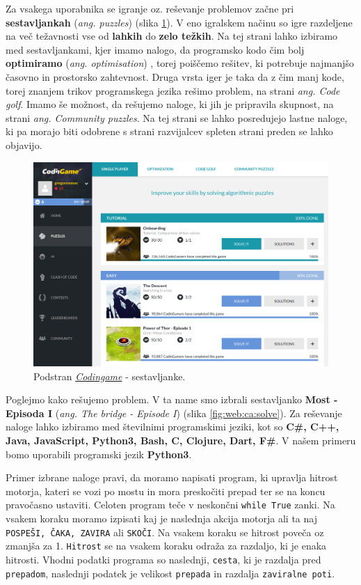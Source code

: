 Za vsakega uporabnika se igranje oz. reševanje problemov začne pri
\textbf{sestavljankah} (\emph{ang. puzzles}) (slika
\ref{fig:web:ca:puzz}). V eno igralskem načinu so igre razdeljene na
več težavnosti vse od \textbf{lahkih} do \textbf{zelo težkih}. Na tej
strani lahko izbiramo med sestavljankami, kjer imamo nalogo, da
programsko kodo čim bolj \textbf{optimiramo}
(\emph{ang. optimisation}) , torej poiščemo rešitev, ki potrebuje
najmanjšo časovno in prostorsko zahtevnost. Druga vrsta iger je taka
da z čim manj kode, torej znanjem trikov programskega jezika rešimo
problem, na strani \emph{ang. Code golf}. Imamo še možnost, da
rešujemo naloge, ki jih je pripravila skupnost, na strani
\emph{ang. Community puzzles}. Na tej strani se lahko posredujejo
lastne naloge, ki pa morajo biti odobrene s strani razvijalcev spleten
strani preden se lahko objavijo.  

\begin{figure}[h!]
  \centering
    \includegraphics [width=0.75\linewidth, keepaspectratio =
   1] {./images/sc_web/codingame_puzz-v01.png}
   \caption{Podstran \emph{\href{https://www.codingame.com}{Codingame}}
\cite{web:codingame} - sestavljanke.}
   \label{fig:web:ca:puzz}
 \end{figure}

 Poglejmo kako rešujemo problem. V ta name smo izbrali sestavljanko
 \textbf{Most - Episoda I} (\emph{ang. The bridge - Episode I}) (slika
 \ref{fig:web:ca:solve}). Za reševanje naloge lahko izbiramo med
 številnimi programskimi jeziki, kot so \textbf{C\#, C++, Java,
   JavaScript, Python3, Bash, C, Clojure, Dart, F\#}. V našem primeru
 bomo uporabili programski jezik \textbf{Python3}.
 
 Primer izbrane naloge pravi, da moramo napisati program, ki upravlja
 hitrost motorja, kateri se vozi po mostu in mora preskočiti prepad
 ter se na koncu pravočasno ustaviti. Celoten program teče v neskončni
 \texttt{while True} zanki. Na vsakem koraku moramo izpisati kaj je
 naslednja akcija motorja ali ta naj \texttt{POSPEŠI, ČAKA, ZAVIRA}
 ali \texttt{SKOČI}. Na vsakem koraku se hitrost poveča oz zmanjša za
 1. \texttt{Hitrost} se na vsakem koraku odraža za razdaljo, ki je
 enaka hitrosti. Vhodni podatki programa so naslednji, \texttt{cesta},
 ki je razdalja pred \texttt{prepadom}, naslednji podatek je velikost
 \texttt{prepada} in razdalja \texttt{zaviralne poti}.

